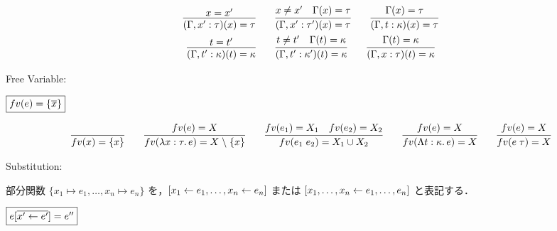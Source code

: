 \begin{gather*}
  \infer{(\Gamma, x': \tau)(x) = \tau}{
    x = x'
  }
  \hspace{2em}
  \infer{(\Gamma, x': \tau')(x) = \tau}{
    x \neq x'
    &
    \Gamma(x) = \tau
  }
  \hspace{2em}
  \infer{(\Gamma, t: \kappa)(x) = \tau}{
    \Gamma(x) = \tau
  }
  \\
  \infer{(\Gamma, t': \kappa)(t) = \kappa}{
    t = t'
  }
  \hspace{2em}
  \infer{(\Gamma, t': \kappa')(t) = \kappa}{
    t \neq t'
    &
    \Gamma(t) = \kappa
  }
  \hspace{2em}
  \infer{(\Gamma, x: \tau)(t) = \kappa}{
    \Gamma(t) = \kappa
  }
\end{gather*}

Free Variable:

$\fbox{$\mathop{fv}(e) = \{\overline{x}\}$}$

\begin{gather*}
  \infer{\freevar(x) = \{x\}}{}
  \hspace{2em}
  \infer{\freevar(\lambda x: \tau\ldotp e) = X \rcomplement \{x\}}{
    \freevar(e) = X
  }
  \hspace{2em}
  \infer{\freevar(e_1\; e_2) = X_1 \cup X_2}{
    \freevar(e_1) = X_1
    &
    \freevar(e_2) = X_2
  }
  \hspace{2em}
  \infer{\freevar(\Lambda t: \kappa\ldotp e) = X}{
    \freevar(e) = X
  }
  \hspace{2em}
  \infer{\freevar(e\; \tau) = X}{
    \freevar(e) = X
  }
\end{gather*}

Substitution:

部分関数 $\{x_1 \mapsto e_1, \ldots, x_n \mapsto e_n\}$ を，$[x_1 \gets e_1, \ldots, x_n \gets e_n]$ または $[x_1, \ldots, x_n \gets e_1, \ldots, e_n]$ と表記する．

$\fbox{$e[\overline{x' \gets e'}] = e''$}$


